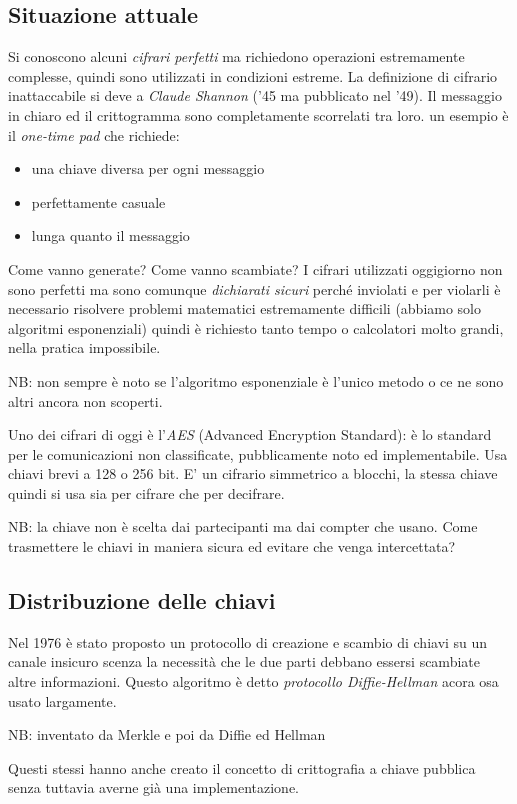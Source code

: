 \subsection{Situazione attuale}
Si conoscono alcuni \emph{cifrari perfetti} ma richiedono operazioni estremamente complesse, quindi sono utilizzati in condizioni estreme. La definizione di cifrario inattaccabile si deve a \emph{Claude Shannon} ('45 ma pubblicato nel '49). Il messaggio in chiaro ed il crittogramma sono completamente scorrelati tra loro. un esempio è il \emph{one-time pad} che richiede:
\begin{itemize}
    \item una chiave diversa per ogni messaggio
    \item perfettamente casuale
    \item lunga quanto il messaggio
\end{itemize}
Come vanno generate? Come vanno scambiate?
I cifrari utilizzati oggigiorno non sono perfetti ma sono comunque \emph{dichiarati sicuri} perché inviolati e per violarli è necessario risolvere problemi matematici estremamente difficili (abbiamo solo algoritmi esponenziali) quindi è richiesto tanto tempo o calcolatori molto grandi, nella pratica impossibile.

NB: non sempre è noto se l'algoritmo esponenziale è l'unico metodo o ce ne sono altri ancora non scoperti.

Uno dei cifrari di oggi è l'\emph{AES} (Advanced Encryption Standard): è lo standard per le comunicazioni non classificate, pubblicamente noto ed implementabile. Usa chiavi brevi a 128 o 256 bit. E' un cifrario simmetrico a blocchi, la stessa chiave quindi si usa sia per cifrare che per decifrare.

NB: la chiave non è scelta dai partecipanti ma dai compter che usano.
Come trasmettere le chiavi in maniera sicura ed evitare che venga intercettata?

\subsection{Distribuzione delle chiavi}
Nel 1976 è stato proposto un protocollo di creazione e scambio di chiavi su un canale insicuro scenza la necessità che le due parti debbano essersi scambiate altre informazioni. Questo algoritmo è detto \emph{protocollo Diffie-Hellman} acora osa usato largamente.

NB: inventato da Merkle e poi da Diffie ed Hellman

Questi stessi hanno anche creato il concetto di crittografia a chiave pubblica senza tuttavia averne già una implementazione.

